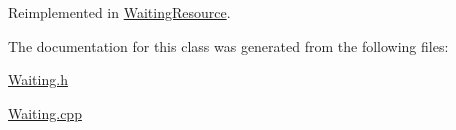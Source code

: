 Reimplemented in \hyperlink{class_waiting_resource_afb0323a90d99b50d66de7f38d069b122}{Waiting\+Resource}.



The documentation for this class was generated from the following files\+:\begin{DoxyCompactItemize}
\item 
\hyperlink{_waiting_8h}{Waiting.\+h}\item 
\hyperlink{_waiting_8cpp}{Waiting.\+cpp}\end{DoxyCompactItemize}
